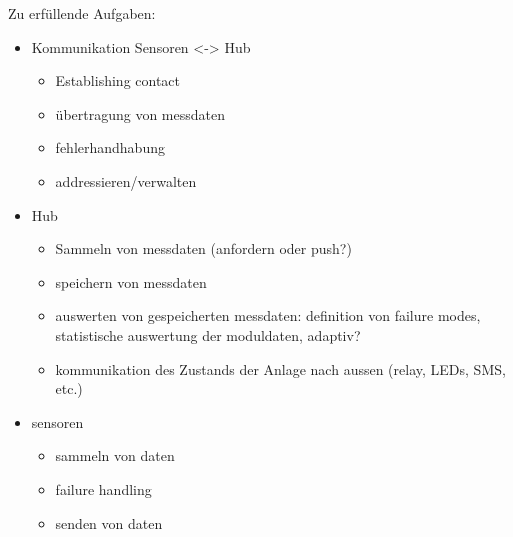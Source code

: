 Zu erf\"ullende Aufgaben:

\begin{itemize}
    \item
        Kommunikation Sensoren <-> Hub
        \begin{itemize}
            \item
                Establishing contact
            \item
                \"ubertragung von messdaten
            \item
                fehlerhandhabung
            \item
                addressieren/verwalten
        \end{itemize}
    \item
        Hub
        \begin{itemize}
            \item
                Sammeln von messdaten (anfordern oder push?)
            \item
                speichern von messdaten
            \item
                auswerten von gespeicherten messdaten: definition von failure modes, statistische auswertung der moduldaten, adaptiv?
            \item
                kommunikation des Zustands der Anlage nach aussen (relay, LEDs, SMS, etc.)
        \end{itemize}
    \item
        sensoren
        \begin{itemize}
            \item
                sammeln von daten
            \item
                failure handling
            \item
                senden von daten
        \end{itemize}
\end{itemize}
